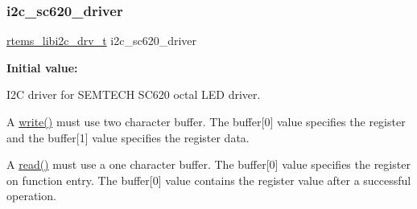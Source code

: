 \subsubsection{\texorpdfstring{i2c\_sc620\_driver}{i2c\_sc620\_driver}}
{\footnotesize\ttfamily \mbox{\hyperlink{structrtems__libi2c__drv__t__}{rtems\+\_\+libi2c\+\_\+drv\+\_\+t}} i2c\+\_\+sc620\+\_\+driver}

{\bfseries Initial value\+:}
\begin{DoxyCode}{0}
\DoxyCodeLine{= \{}
\DoxyCodeLine{\}}

\end{DoxyCode}


I2C driver for S\+E\+M\+T\+E\+CH S\+C620 octal L\+ED driver. 

A \mbox{\hyperlink{libcsupport_2src_2write_8c_a448dd253ee4c0e3d3b1275df845e7146}{write()}} must use two character buffer. The buffer\mbox{[}0\mbox{]} value specifies the register and the buffer\mbox{[}1\mbox{]} value specifies the register data.

A \mbox{\hyperlink{libcsupport_2src_2read_8c_a26d4711c05afec4c7771c3d17b2db9e9}{read()}} must use a one character buffer. The buffer\mbox{[}0\mbox{]} value specifies the register on function entry. The buffer\mbox{[}0\mbox{]} value contains the register value after a successful operation. 